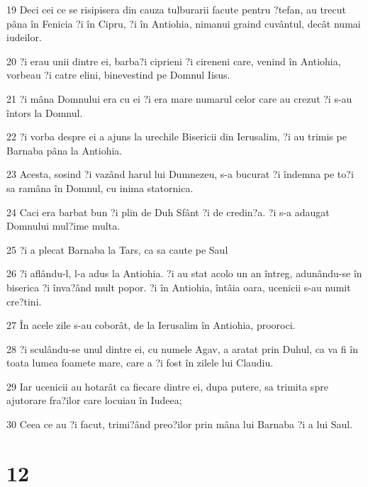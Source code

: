 \par 19 Deci cei ce se risipisera din cauza tulburarii facute pentru ?tefan, au trecut pâna în Fenicia ?i în Cipru, ?i în Antiohia, nimanui graind cuvântul, decât numai iudeilor.
\par 20 ?i erau unii dintre ei, barba?i ciprieni ?i cireneni care, venind în Antiohia, vorbeau ?i catre elini, binevestind pe Domnul Iisus.
\par 21 ?i mâna Domnului era cu ei ?i era mare numarul celor care au crezut ?i s-au întors la Domnul.
\par 22 ?i vorba despre ei a ajuns la urechile Bisericii din Ierusalim, ?i au trimis pe Barnaba pâna la Antiohia.
\par 23 Acesta, sosind ?i vazând harul lui Dumnezeu, s-a bucurat ?i îndemna pe to?i sa ramâna în Domnul, cu inima statornica.
\par 24 Caci era barbat bun ?i plin de Duh Sfânt ?i de credin?a. ?i s-a adaugat Domnului mul?ime multa.
\par 25 ?i a plecat Barnaba la Tars, ca sa caute pe Saul
\par 26 ?i aflându-l, l-a adus la Antiohia. ?i au stat acolo un an întreg, adunându-se în biserica ?i înva?ând mult popor. ?i în Antiohia, întâia oara, ucenicii s-au numit cre?tini.
\par 27 În acele zile s-au coborât, de la Ierusalim în Antiohia, prooroci.
\par 28 ?i sculându-se unul dintre ei, cu numele Agav, a aratat prin Duhul, ca va fi în toata lumea foamete mare, care a ?i fost în zilele lui Claudiu.
\par 29 Iar ucenicii au hotarât ca fiecare dintre ei, dupa putere, sa trimita spre ajutorare fra?ilor care locuiau în Iudeea;
\par 30 Ceea ce au ?i facut, trimi?ând preo?ilor prin mâna lui Barnaba ?i a lui Saul.

\chapter{12}

